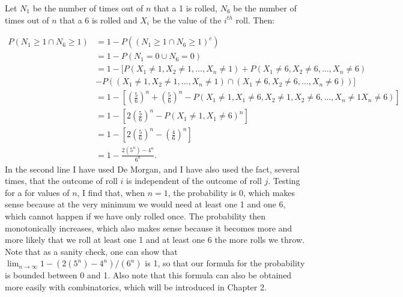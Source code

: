 \begin{problem}{26}  Let $N_1$ be the number of times out of $n$ that a 1 is rolled, $N_6$ be the number of times out of $n$ that a 6 is rolled and $X_i$ be the value of the $i^{th}$ roll.  Then:

\begin{align*}
	P(N_1 \ge 1 \cap N_6 \ge 1) &= 1 - P((N_1 \ge 1 \cap N_6 \ge 1)^c) \\
	&= 1 - P(N_1= 0 \cup N_6=0) \\
	& = 1-[P(X_1 \ne 1, X_2 \ne 1, \ldots, X_n \ne 1)+P(X_1 \ne 6, X_2 \ne 6, \ldots, X_n \ne 6) \\
	& - P((X_1 \ne 1, X_2 \ne 1, \ldots, X_n \ne 1)\cap (X_1 \ne 6, X_2 \ne 6, \ldots, X_n \ne 6))] \\
	& =1-\left [ \left (\frac{5}{6} \right )^n+\left (\frac{5}{6}\right)^n - P(X_1 \ne 1, X_1 \ne 6, X_2 \ne 1, X_2 \ne 6, \ldots, X_n \ne 1 X_n \ne 6)\right] \\
	& =1-\left [2 \left (\frac{5}{6} \right )^n - P(X_1 \ne 1, X_1 \ne 6)^n \right] \\
	& = 1-\left [ 2\left (\frac{5}{6} \right )^n-\left (\frac{4}{6} \right )^n \right] \\
	& =1 - \frac{2(5^n) -4^n}{6^n}.
\end{align*}
In the second line I have used De Morgan, and I have also used the fact, several times, that the outcome of roll $i$ is independent of the outcome of roll $j$.  Testing for a for values of $n$, I find that, when $n=1$, the probability is 0, which makes sense because at the very minimum we would need at least one 1 and one 6, which cannot happen if we have only rolled once.  The probability then monotonically increases, which also makes sense because it becomes more and more likely that we roll at least one 1 and at least one 6 the more rolls we throw.  Note that as a sanity check, one can show that $\lim_{n \rightarrow \infty} 1 - (2(5^n) -4^n)/(6^n)$ is 1, so that our formula for the probability is bounded between 0 and 1.  Also note that this formula can also be obtained more easily with combinatorics, which will be introduced in Chapter 2.

\end{problem}

